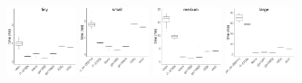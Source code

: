 \documentclass[../document.tex]{subfiles}
\begin{document}
\begin{figure}
	\begin{subfigure}{0.09\textwidth} \label{fig:time-dwt} \vspace{5mm}\end{subfigure}
	\begin{subfigure}{0.9\textwidth}
		\includegraphics[width=0.22\textwidth]{figures/time-results/generate_dwt_tiny_boxplot-1}
		\includegraphics[width=0.22\textwidth]{figures/time-results/generate_dwt_small_boxplot-1}
		\includegraphics[width=0.22\textwidth]{figures/time-results/generate_dwt_medium_boxplot-1}
		\includegraphics[width=0.22\textwidth]{figures/time-results/generate_dwt_large_boxplot-1}
	\end{subfigure}


\end{figure}
\end{document}
